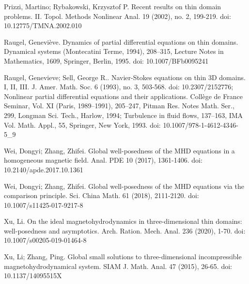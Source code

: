 \documentclass[10pt,reqno]{amsart}
\numberwithin{equation}{section}
\begin{document}
\begin{thebibliography}{99}
	
	
Prizzi, Martino; Rybakowski, Krzysztof P. Recent results on thin domain problems. II. Topol. Methods Nonlinear Anal. 19 (2002), no. 2, 199-219. doi: 10.12775/TMNA.2002.010

	
	 Raugel, Geneviève. Dynamics of partial differential equations on thin domains. Dynamical systems (Montecatini Terme, 1994), 208–315, Lecture Notes in Mathematics, 1609, Springer, Berlin, 1995. doi: 10.1007/BFb0095241
	
	
	 Raugel, Genevieve; Sell, George R.. Navier-Stokes equations on thin 3D domains. I, II, III. J. Amer. Math. Soc. 6 (1993), no. 3, 503-568. doi: 10.2307/2152776; Nonlinear partial differential equations and their applications. Collège de France Seminar, Vol. XI (Paris, 1989–1991), 205–247, Pitman Res. Notes Math. Ser., 299, Longman Sci. Tech., Harlow, 1994; Turbulence in fluid flows,  137–163, IMA Vol. Math. Appl., 55, Springer, New York, 1993. doi: 10.1007/978-1-4612-4346-5\_9


	
	
	 Wei, Dongyi; Zhang, Zhifei. Global well-posedness of the MHD equations in a homogeneous magnetic field. 
	Anal. PDE 10 (2017), 1361-1406. doi: 10.2140/apde.2017.10.1361 
	
	
	 Wei, Dongyi; Zhang, Zhifei. Global well-posedness of the MHD equations via the comparison principle.  
	Sci. China Math. 61 (2018), 2111-2120. doi: 10.1007/s11425-017-9217-8
	
	
	 Xu, Li. On the ideal magnetohydrodynamics in three-dimensional thin domains: well-posedness and asymptotics. 
	Arch. Ration. Mech. Anal.  236 (2020), 1-70. doi: 10.1007/s00205-019-01464-8
	
	
	 Xu, Li; Zhang, Ping. Global small solutions to three-dimensional incompressible magnetohydrodynamical system. 
	SIAM J. Math. Anal. 47 (2015), 26-65. doi: 10.1137/14095515X
	

	

\end{thebibliography}
\end{document}
